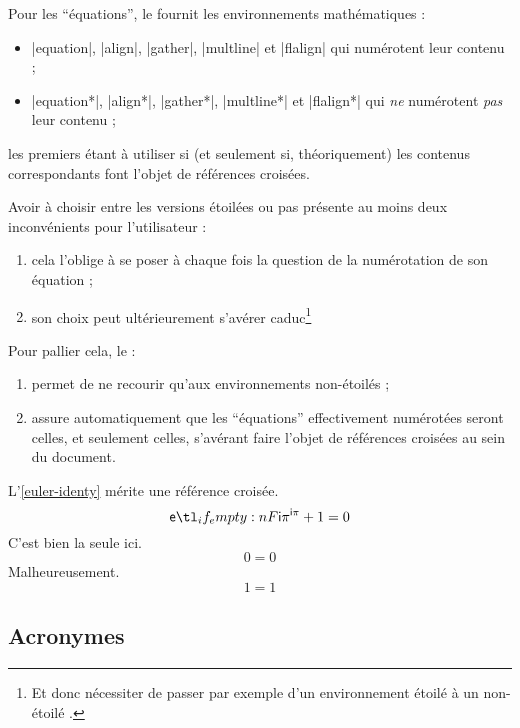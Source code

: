 \documentclass[french,nolocaltoc]{nwejmart}
\newtheorem[title=Fait,style=definition]{fact}
\begin{document}
Pour les \enquote{équations}, le  fournit les environnements
mathématiques :
\begin{itemize}
\item |equation|, |align|, |gather|, |multline| et |flalign| qui numérotent
  leur contenu ;
\item |equation*|, |align*|, |gather*|, |multline*| et |flalign*| qui \emph{ne}
  numérotent \emph{pas} leur contenu ;
\end{itemize}
les premiers étant à utiliser si (et seulement si, théoriquement) les contenus
correspondants font l'objet de références croisées.

Avoir à choisir entre les versions étoilées ou pas présente au moins deux
inconvénients pour l'utilisateur :
\begin{enumerate}
\item cela l'oblige à se poser à chaque fois la question de la
  numérotation de son équation ;
\item son choix peut ultérieurement s'avérer caduc\footnote{Et donc nécessiter
    de passer par exemple d'un environnement étoilé à un non-étoilé .}
\end{enumerate}
Pour pallier cela, le  :
\begin{enumerate}
\item permet de ne recourir qu'aux environnements non-étoilés ;
\item assure automatiquement que les \enquote{équations} effectivement
  numérotées seront celles, et seulement celles, s'avérant faire l'objet de
  références croisées au sein du document.
\end{enumerate}

\begin{bodycode}[listing and text,listing options={deletekeywords={label}}]
L'\vref{euler-identy} mérite une référence croisée.
\begin{equation}\label{euler-identy}
  \E[\I\pi]+1=0
\end{equation}
C'est bien la seule ici.
\begin{equation}\label{not-interesting}
  0=0
\end{equation}
Malheureusement.
\begin{equation}
  1=1
\end{equation}
\end{bodycode}

\subsection{Acronymes}
\label{sec:acronymes}
\end{document}
